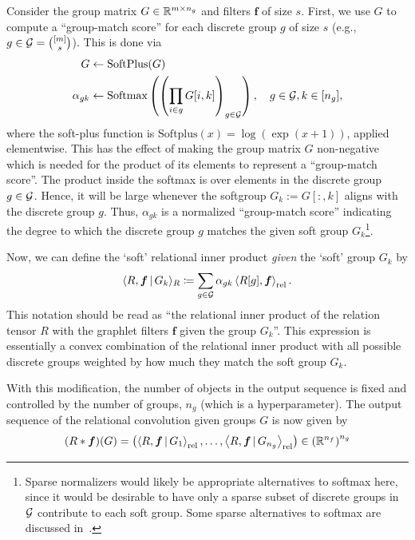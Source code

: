 Consider the group matrix $G \in \mathbb{R}^{m \times n_g}$ and filters $\bm{f}$ of size $s$. First, we use $G$ to compute a ``group-match score'' for each discrete group $g$ of size $s$ (e.g., $g \in {\mathcal{G}} = \binom{[m]}{s}$). This is done via
\begin{equation}
    \label{eq:group_match_score}
    \begin{split}
        G &\gets \text{SoftPlus}(G)\\
        \alpha_{gk} &\gets \text{Softmax}\left(\left(\prod_{i \in g} G[i,k]\right)_{g \in {\mathcal{G}}}\right), \quad g \in {\mathcal{G}}, k \in [n_g],
    \end{split}
\end{equation}
where the soft-plus function is $\text{Softplus}(x) = \log(\exp(x + 1))$, applied elementwise. This has the effect of making the group matrix $G$ non-negative which is needed for the product of its elements to represent a ``group-match score''. The product inside the softmax is over elements in the discrete group $g \in {\mathcal{G}}$. Hence, it will be large whenever the softgroup $G_k := G[:, k]$ aligns with the discrete group $g$. Thus, $\alpha_{gk}$ is a normalized ``group-match score'' indicating the degree to which the discrete group $g$ matches the given soft group $G_k$\footnote{Sparse normalizers would likely be appropriate alternatives to softmax here, since it would be desirable to have only a sparse subset of discrete groups in ${\mathcal{G}}$ contribute to each soft group. Some sparse alternatives to softmax are discussed in~\citep{lahaControllableSparseAlternatives2018a}.}. %

Now, we can define the `soft' relational inner product \textit{given} the `soft' group $G_k$ by
\begin{equation}
    \label{eq:soft_relational_inner_prod}
    \langle R, \boldsymbol{f} \, \vert \, G_k \rangle_R \coloneqq \sum_{g \in {\mathcal{G}}} \alpha_{gk} \left \langle R[g], \boldsymbol{f} \right\rangle_\mathrm{rel}.
\end{equation}
This notation should be read as ``the relational inner product of the relation tensor $R$ with the graphlet filters $\boldsymbol{f}$ given the group $G_k$''. This expression is essentially a convex combination of the relational inner product with all possible discrete groups weighted by how much they match the soft group $G_k$.

With this modification, the number of objects in the output sequence is fixed and controlled by the number of groups, $n_g$ (which is a hyperparameter). The output sequence of the relational convolution given groups $G$ is now given by
\begin{equation}
    \label{eq:soft_relational_convolution_groups}
    (R \ast \bm{f})(G) = \left( \left\langle R, \bm{f} \, \vert \, G_1 \right\rangle_\mathrm{rel}, \ldots, \left\langle R, \bm{f} \, \vert \, G_{n_g} \right\rangle_\mathrm{rel} \right) \in \left(\mathbb{R}^{n_f}\right)^{n_g}
\end{equation}
